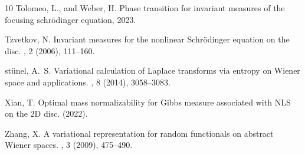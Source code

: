 \documentclass[%
11pt,  reqno]{amsart}
\theoremstyle{remarkstyle}
\newcommand{\1}{\hspace{0.2mm}\text{I}\hspace{0.2mm}}
\numberwithin{equation}{section}
\numberwithin{theorem}{section}
\begin{document}
\begin{thebibliography}{10}
		{\sc Tolomeo, L., and Weber, H.}
		\newblock Phase transition for invariant measures of the focusing schr\"odinger
		equation, 2023.
		
		{\sc Tzvetkov, N.}
		\newblock Invariant measures for the nonlinear {S}chr\"odinger equation on the
		disc.
		, 2 (2006),
		111--160.
		
		{st{\"u}nel, A.~S.}
		\newblock Variational calculation of {L}aplace transforms via entropy on
		{W}iener space and applications.
		, 8 (2014), 3058--3083.
		
		{\sc Xian, T.}
		\newblock Optimal mass normalizability for {G}ibbs measure associated with
		{NLS} on the {2D} disc.
		 (2022).
		
		{\sc Zhang, X.}
		\newblock A variational representation for random functionals on abstract
		{W}iener spaces.
		, 3 (2009),
		475--490.
		
	\end{thebibliography}
	
	
	
\end{document}
